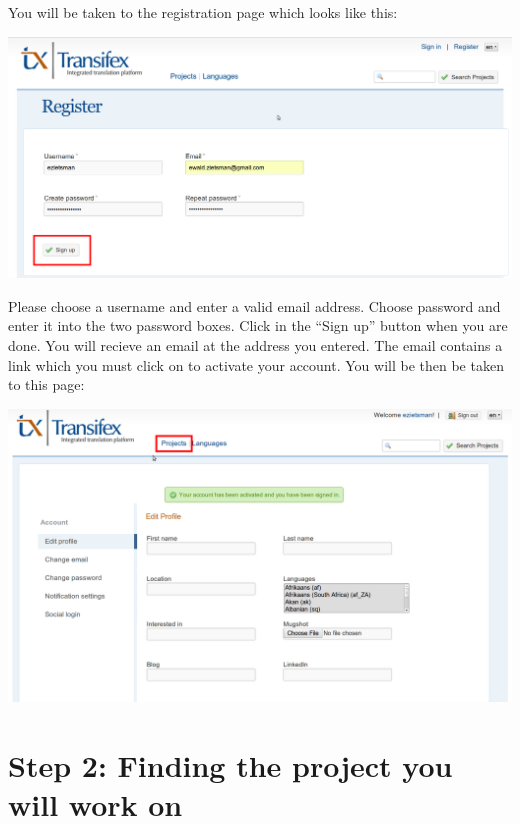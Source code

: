 \documentclass[10pt, a4paper]{article}
\begin{document}
You will be taken to the registration page which looks like this:
\begin{center}
    \centerline{\includegraphics[width=0.8\paperwidth]{images/enterdetails.png}}
\end{center}
Please choose a username and enter a valid email address. Choose password and enter it into the two password boxes. Click in the ``Sign up'' button when you are done. You will recieve an email at the address you entered. The email contains a link which you must click on to activate your account. You will be then be taken to this page:
\begin{center}
    \centerline{\includegraphics[width=0.8\paperwidth]{images/signedin.png}}
\end{center}



\section*{Step 2: Finding the project you will work on}
\end{document}
